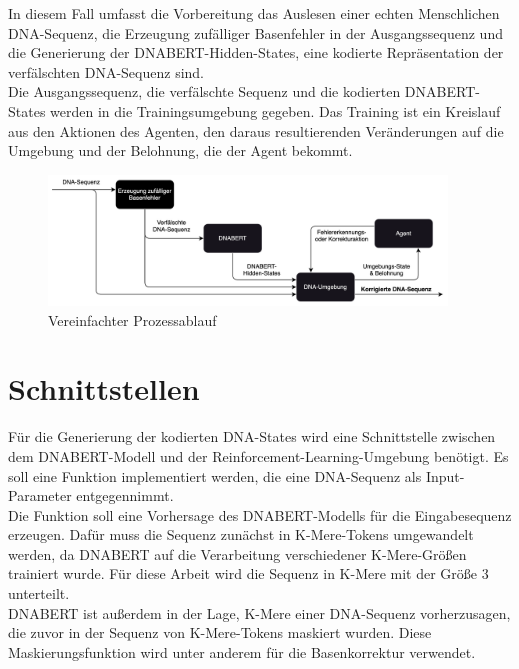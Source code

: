\documentclass[oneside,bibliography=totocnumbered,BCOR=5mm]{scrbook}%
\theoremstyle{definition}
\theoremstyle{definition}
\theoremstyle{definition}
\theoremstyle{definition}
\theoremstyle{definition}
\theoremstyle{definition}
\begin{document}
In diesem Fall umfasst die Vorbereitung das Auslesen einer echten Menschlichen DNA-Sequenz,
die Erzeugung zufälliger Basenfehler in der Ausgangssequenz und die Generierung der DNABERT-Hidden-States, 
eine kodierte Repräsentation der verfälschten DNA-Sequenz sind. \\

Die Ausgangssequenz, die verfälschte Sequenz und die kodierten DNABERT-States werden in die Trainingsumgebung
gegeben. Das Training ist ein Kreislauf aus den Aktionen des Agenten, den daraus resultierenden 
Veränderungen auf die Umgebung und der Belohnung, die der Agent bekommt.\\
\linebreak[4]
\linebreak[4]

\begin{figure}[h]
  \centering
  \includegraphics[width=400px,keepaspectratio]{images/Process_simplified.png}
  \caption{Vereinfachter Prozessablauf}
  \label{process_simplified}
  \end{figure}

\newpage

\section{Schnittstellen}
Für die Generierung der kodierten DNA-States wird eine Schnittstelle zwischen dem 
DNABERT-Modell und der Reinforcement-Learning-Umgebung benötigt. 
Es soll eine Funktion implementiert werden, die eine DNA-Sequenz als Input-Parameter entgegennimmt. \\

Die Funktion soll eine Vorhersage des DNABERT-Modells für die Eingabesequenz erzeugen.
Dafür muss die Sequenz zunächst in K-Mere-Tokens umgewandelt werden, da DNABERT auf die Verarbeitung
verschiedener K-Mere-Größen trainiert wurde. 
Für diese Arbeit wird die Sequenz in K-Mere mit der Größe 3 unterteilt. \\

DNABERT ist außerdem in der Lage, K-Mere einer DNA-Sequenz vorherzusagen, die zuvor in der
Sequenz von K-Mere-Tokens maskiert wurden. Diese Maskierungsfunktion wird unter anderem für die 
Basenkorrektur verwendet. \\
\end{document}
